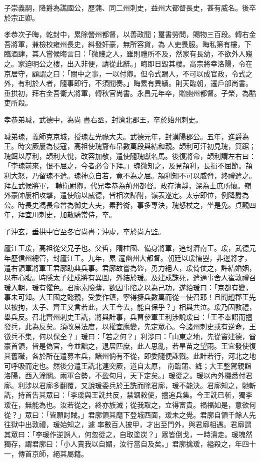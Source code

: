 \begin{pinyinscope}
 子崇義嗣，降爵為譙國公，歷蒲、同二州刺史，益州大都督長史，甚有威名。後卒於宗正卿。



 孝恭次子晦，乾封中，累除營州都督，以善政聞；璽書勞問，賜物三百段。轉右金吾將軍，兼檢校雍州長史，糾發奸豪，無所容貸，為
 人吏畏服。晦私第有樓，下臨酒肆，其人嘗候晦言曰：「微賤之人，雖則禮所不及，然家有長幼，不欲外人窺之。家迫明公之樓，出入非便，請從此辭。」晦即日毀其樓。高宗將幸洛陽，令在京居守，顧謂之曰：「關中之事，一以付卿。但令式跼人，不可以成官政，令式之外，有利於人者，隨事即行，不須聞奏。」晦累有異績。則天臨朝，遷戶部尚書。垂拱初，拜右金吾衛大將軍，轉秋官尚書。永昌元年卒，贈幽州都督。子榮，為酷吏所殺。



 孝恭弟瑊，武德中，為尚
 書右丞，封濟北郡王，卒於始州刺史。



 瑊弟瑰，義師克京城，授瑰左光祿大夫。武德元年，封漢陽郡公。五年，進爵為王。時突厥屢為侵寇，高祖使瑰齎布帛數萬段與結和親。頡利可汗初見瑰，箕踞；瑰餌以厚利，頡利大悅，改容加敬，遣使隨瑰獻名馬。後復將命，頡利謂左右曰：「李瑰前來，恨不屈之，今者必令下拜。」瑰微知之，及見頡利，長揖不屈節。頡利大怒，乃留瑰不遣。瑰神意自若，竟不為之屈。頡利知不可以威脅，終禮遣之。拜左武候將軍，
 轉衛尉卿，代兄孝恭為荊州都督。政存清靜，深為士庶所懷。嶺外豪帥屢相攻擊，遣使喻以威德，皆相次歸附，嶺表遂定。太宗即位，例降爵為公。時長史馮長命曾為御史大夫，素矜衒，事多專決，瑰怒杖之，坐是免。貞觀四年，拜宜川刺史，加散騎常侍，卒。



 子沖玄，垂拱中官至冬官尚書；沖虛，卒於尚方監。



 廬江王瑗，高祖從父兄子也。父哲，隋柱國、備身將軍，追封濟南王。瑗，武德元年歷信州總管，封廬江王。九年，累
 遷幽州大都督。朝廷以瑗懦曌，非邊將才，遣右領軍將軍王君廓助典兵事。君廓故嘗為盜，勇力絕人，瑗倚仗之，許結婚姻，以布心腹。時隱太子建成將有異圖，外結於瑗。及建成誅死，遣通事舍人崔敦禮召瑗入朝，瑗有懼色。君廓素險薄，欲因事陷之以為己功，遂紿瑗曰：「京都有變，事未可知。大王國之懿親，受委作鎮，寧得擁兵數萬而從一使召耶！且聞趙郡王先以被拘，太子、齊王又言若此，大王今去，能自保乎？」相與共泣。瑗乃囚敦禮，
 舉兵反。召北齊州刺史王詵，將與計事，兵曹參軍王利涉說瑗曰：「王不奉詔而擅發兵，此為反矣。須改易法度，以權宜應變，先定眾心。今諸州刺史或有逆命，王徵兵不集，何以保全？」瑗曰：「若之何？」利涉曰：「山東之地，先從竇建德，酋豪首領，皆是偽官，今並黜之，退居匹庶，此人思亂，若旱苗之望雨。王宜發使復其舊職，各於所在遣募本兵，諸州倘有不從，即委隨便誅戮。此計若行，河北之地可呼吸而定也。然後分遣王詵北連突厥，道自太原，
 南臨蒲、絳；大王整駕親詣洛陽，西入潼關。兩軍合勢，不盈旬月，天下定矣。」瑗從之。瑗以內外機悉付君廓。利涉以君廓多翻覆，又說瑗委兵於王詵而除君廓，瑗不能決。君廓知之，馳斬詵，持首告其眾曰：「李瑗與王詵共反，禁錮敕使，擅追兵集。今王詵已斬，獨李瑗在，無能為也。汝若從之，終亦族滅；從我取之，立得富貴。禍福如是，意欲何從？」眾曰：「皆願討賊。」君廓領其麾下登城西面，瑗未之覺。君廓自領千餘人先往獄中出敦禮，瑗始知之，遽
 率數百人披甲，才出至門外，與君廓相遇。君廓謂其眾曰：「李瑗作逆誤人，何忽從之，自取塗炭？」眾皆倒戈，一時潰走。瑗塊然獨存，謂君廓曰：「小人賣我以自媚，汝行當自及矣。」君廓擒瑗，縊殺之，年四十一，傳首京師，絕其屬籍。




\end{pinyinscope}
